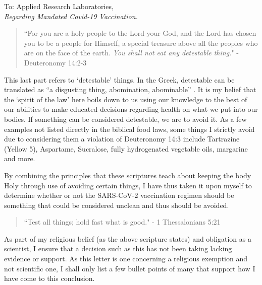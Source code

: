 \documentclass[]{letter}
\begin{document}
\begin{letter}{To: Applied Research Laboratories,\\ \textit{Regarding Mandated Covid-19 Vaccination.}}
\begin{quotation}
	``For you are a holy people to the Lord your God, and the Lord has chosen you to be a people for Himself, a special treasure above all the peoples who are on the face of the earth. \textit{You shall not eat any detestable thing.}" - Deuteronomy 14:2-3
\end{quotation}

\hspace{1cm}This last part refers to `detestable' things. In the Greek, detestable can be translated as ``a disgusting thing, abomination, abominable'' \cite{Strongs}. It is my belief that the `spirit of the law' here boils down to us using our knowledge to the best of our abilities to make educated decisions regarding health on what we put into our bodies. If something can be considered detestable, we are to avoid it. As a few examples not listed directly in the biblical food laws, some things I strictly avoid due to considering them a violation of Deuteronomy 14:3 include Tartrazine (Yellow 5), Aspartame, Sucralose, fully hydrogenated vegetable oils, margarine and more. 

\hspace{1cm}By combining the principles that these scriptures teach about keeping the body Holy through use of avoiding certain things, I have thus taken it upon myself to determine whether or not the SARS-CoV-2 vaccination regimen should be something that could be considered unclean and thus should be avoided. 

\begin{quotation}
	``Test all things; hold fast what is good." - 1 Thessalonians 5:21
\end{quotation}

\hspace{1cm}As part of my religious belief (as the above scripture states) and obligation as a scientist, I ensure that a decision such as this has not been taking lacking evidence or support. As this letter is one concerning a religious exemption and not scientific one, I shall only list a few bullet points of many that support how I have come to this conclusion.


\end{letter}
\end{document}
